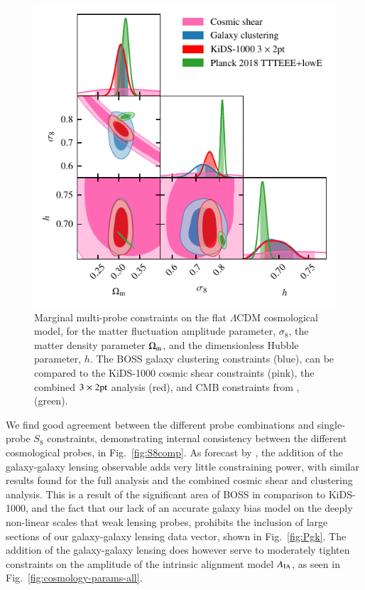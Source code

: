 \begin{figure}
	\begin{center}
		\includegraphics[width=\columnwidth]{Parameter_Plots/cosmology/omegam_sigma8_h_blind_C}
		\caption{Marginal multi-probe constraints on the flat $\Lambda$CDM cosmological model, for the matter fluctuation amplitude parameter, $\sigma_8$, the matter density parameter $\Omega_{\rm m}$, and the dimensionless Hubble parameter, $h$.  The BOSS galaxy clustering constraints (blue), can be compared to the KiDS-1000 cosmic shear constraints (pink), the combined $3\times2{\rm pt}$ analysis (red), and CMB constraints from \citet{planck/etal:2018}, (green).}
		\label{fig:cosmology-params}
	\end{center}
\end{figure}

We find good agreement between the different probe combinations and single-probe $S_8$ constraints, demonstrating internal consistency between the different cosmological probes, in Fig.~\ref{fig:S8comp}.  
As forecast by \citet{joachimi/etal:inprep}, the addition of the galaxy-galaxy lensing observable adds very little constraining power, with similar results found for the full \tttp analysis and the combined cosmic shear and clustering analysis. 
This is a result of the significant area of BOSS in comparison to KiDS-1000, and the fact that our lack of an accurate galaxy bias model on the deeply non-linear scales that weak lensing probes,
prohibits the inclusion of large sections of our galaxy-galaxy lensing data vector, shown in Fig.~\ref{fig:Pgk}.  
The addition of the galaxy-galaxy lensing does however serve to moderately tighten constraints on the amplitude of the intrinsic alignment model $A_{\rm IA}$,  as seen in Fig.~\ref{fig:cosmology-params-all}. 

